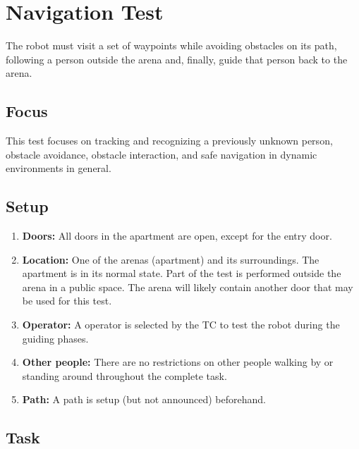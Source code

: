 \section{Navigation Test}

The robot must visit a set of waypoints while avoiding obstacles on its path, following a person outside the arena and, finally, guide that person back to the arena.

\subsection{Focus}
This test focuses on tracking and recognizing a previously unknown person, obstacle avoidance, obstacle interaction, and safe navigation in dynamic environments in general.

\subsection{Setup}

\begin{enumerate}
	\item \textbf{Doors:} All doors in the apartment are open, except for the entry door. 
	\item \textbf{Location:} One of the arenas (apartment) and its surroundings. The apartment is in its normal state. Part of the test is performed outside the arena in a public space.
	The arena will likely contain another door that may be used for this test.
	\item \textbf{Operator:} A  operator is selected by the TC to test the robot during the guiding phases.
	\item \textbf{Other people:} There are no restrictions on other people walking by or standing around throughout the complete task.
	\item \textbf{Path:} A path is setup (but not announced) beforehand.
\end{enumerate}

\subsection{Task}
%
%

